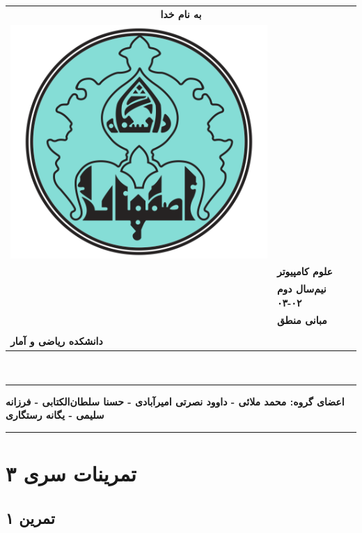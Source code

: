 \documentclass[]{exam}
\begin{document}
\pagestyle{head}
\firstpageheader{}{}{}
\runningheadrule
\begin{tabular}{p{} l}
\multicolumn{2}{c}{\textbf{به نام خدا}}\\
\multirow{2}{*}{\includegraphics[scale=0.2] {UILOGO.png}} & \\ \\
&  \textbf{علوم کامپیوتر}\\
&  \textbf{نیم‌سال دوم ۰۲-۰۳}\\
&  \textbf{مبانی منطق}\\ \\
 \textbf{دانشکده ریاضی و آمار} &  \\
\end{tabular}\\

\rule[1ex]{\textwidth}{.1pt}
\textbf{
    اعضای گروه: 
    محمد ملائی - داوود نصرتی امیرآبادی - 
    حسنا سلطان‌الکتابی - فرزانه سلیمی - یگانه رستگاری
}


\rule[1ex]{\textwidth}{.1pt}
\vspace{0pt}

\section*{تمرینات سری ۳}
\subsection*{تمرین ۱}



\subsection*{\color{blue}{جواب}}
\end{document}
